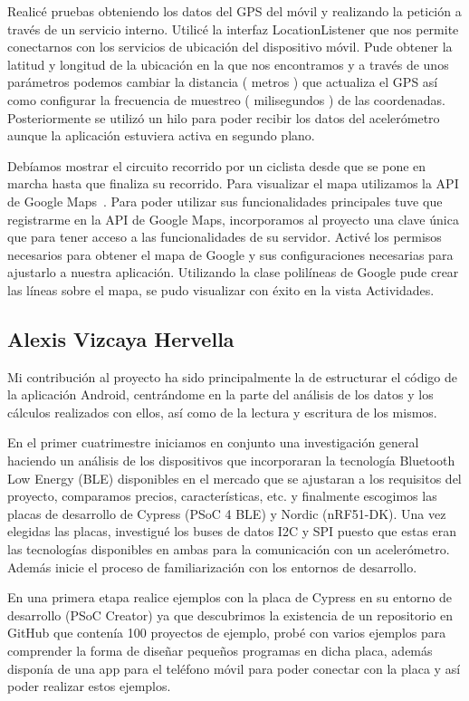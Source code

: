 Realicé pruebas obteniendo los datos del GPS del móvil y realizando la petición a través de un servicio interno. Utilicé la interfaz LocationListener que nos  permite conectarnos con los servicios de ubicación del dispositivo móvil. Pude obtener la latitud y longitud de la ubicación en la que nos encontramos y a través de unos parámetros podemos cambiar la distancia ( metros ) que actualiza el GPS así como configurar la frecuencia de muestreo ( milisegundos ) de las coordenadas. Posteriormente se utilizó un hilo para poder recibir los datos del acelerómetro aunque la aplicación estuviera activa en segundo plano.

Debíamos mostrar el circuito recorrido por un ciclista desde que se pone en marcha hasta que finaliza su recorrido. Para visualizar el mapa utilizamos la API de Google Maps~\cite{APIGoogleMaps}. Para poder utilizar sus funcionalidades principales tuve que registrarme en la API de Google Maps, incorporamos al proyecto una clave única que para tener acceso a las funcionalidades de su servidor. Activé los permisos necesarios para obtener el mapa de Google y sus configuraciones necesarias para ajustarlo a nuestra aplicación. Utilizando la clase polilíneas de Google pude crear las líneas sobre el mapa, se pudo visualizar con éxito en la vista Actividades.

\subsection{Alexis Vizcaya Hervella}

Mi contribución al proyecto ha sido principalmente la de estructurar el código de la aplicación Android, centrándome en la parte del análisis de los datos y los cálculos realizados con ellos, así como de la lectura y escritura de los mismos.  

En el primer cuatrimestre iniciamos en conjunto una investigación general haciendo un análisis de los dispositivos que incorporaran la tecnología Bluetooth Low Energy (BLE) disponibles en el mercado que se ajustaran a los requisitos del proyecto, comparamos precios, características, etc. y finalmente escogimos las placas de desarrollo de Cypress (PSoC 4 BLE) y Nordic (nRF51-DK). Una vez elegidas las placas, investigué los buses de datos I2C y SPI puesto que estas eran las tecnologías disponibles en ambas para la comunicación con un acelerómetro. Además inicie el proceso de familiarización con los entornos de desarrollo.

En una primera etapa realice ejemplos con la placa de Cypress en su entorno de desarrollo (PSoC Creator) ya que descubrimos la existencia de un repositorio en GitHub que contenía 100 proyectos de ejemplo, probé con varios ejemplos para comprender la forma de diseñar pequeños programas en dicha placa, además disponía de una app para el teléfono móvil para poder conectar con la placa y así poder realizar estos ejemplos. 

